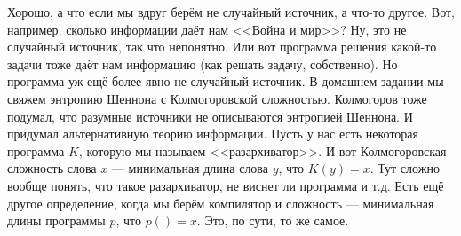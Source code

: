 \documentclass{article}
\begin{document}
\begin{itemize}
        \begin{Comment}
            Хорошо, а что если мы вдруг берём не случайный источник, а что-то другое. Вот, например, сколько информации даёт нам <<Война и мир>>? Ну, это не случайный источник, так что непонятно. Или вот программа решения какой-то задачи тоже даёт нам информацию (как решать задачу, собственно). Но программа уж ещё более явно не случайный источник. В домашнем задании мы свяжем энтропию Шеннона с Колмогоровской сложностью. Колмогоров тоже подумал, что разумные источники не описываются энтропией Шеннона. И придумал альтернативную теорию информации. Пусть у нас есть некоторая программа $K$, которую мы называем <<разархиватор>>. И вот Колмогоровская сложность слова $x$ --- минимальная длина слова $y$, что $K(y)=x$. Тут сложно вообще понять, что такое разархиватор, не виснет ли программа и т.д. Есть ещё другое определение, когда мы берём компилятор и сложность --- минимальная длины программы $p$, что $p()=x$. Это, по сути, то же самое.
        \end{Comment}
    \end{itemize}
\end{document}
